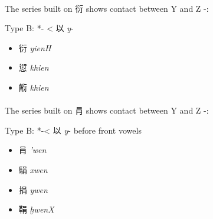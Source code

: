 


\paragraph{}
The series built on 衍 
shows contact between Y and Z -:

Type B: *{}- <
以 \emph{y}- 

\begin{itemize}\item
{\Large{衍}}  \emph{yienH} %

\item
{\Large{愆}}  \emph{khien} %

\item
{\Large{餰}} \emph{khien} %
\end{itemize}


\paragraph{}
The series built on 肙 
shows contact between Y and Z -:

Type B: *{}-< 以  \emph{y}- before front vowels

\begin{itemize}\item
{\Large{肙}}  \emph{'wen} %
\item
{\Large{駽}}  \emph{xwen} %
\item
{\Large{捐}}  \emph{ywen} %
\item
{\Large{鞙}}  \emph{ḫwenX} %
\end{itemize}

\vspace{3mm}




